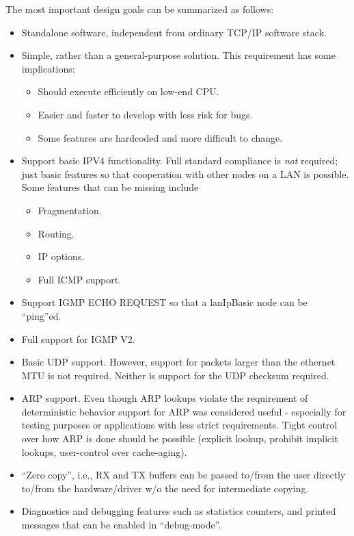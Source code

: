 \documentclass{article}
\newcommand{\lip}{lanIpBasic}
\newcommand{\ethn}{ethernet}
\begin{document}
The most important design goals can be summarized as
follows:
\begin{itemize}
\item Standalone software, independent from ordinary TCP/IP software stack.
\item Simple, rather than a general-purpose solution. This requirement
      has some implications:
      \begin{itemize}
      \item Should execute efficiently on low-end CPU.
      \item Easier and faster to develop with less risk for bugs.
      \item Some features are hardcoded and more difficult to change.
      \end{itemize}
\item Support basic IPV4 functionality. Full standard compliance is
      {\em not} required; just basic features so that cooperation
      with other nodes on a LAN is possible. Some features that
      can be missing include
      \begin{itemize}
      \item Fragmentation.
      \item Routing.
      \item IP options.
      \item Full ICMP support.
      \end{itemize}
\item Support IGMP ECHO REQUEST so that a \lip{} node can be ``ping''ed.
\item Full support for IGMP V2.
\item Basic UDP support. However, support for packets larger than the
      \ethn{} MTU is not required. Neither is support for the UDP checksum
      required.
\item ARP support. Even though ARP lookups violate the requirement of
      deterministic behavior support for ARP was considered useful - especially
      for testing purposes or applications with less strict requirements.
      Tight control over how ARP is done should be possible (explicit lookup,
      prohibit implicit lookups, user-control over cache-aging).
\item ``Zero copy'', i.e., RX and TX buffers can be passed to/from the
      user directly to/from the hardware/driver w/o the need for intermediate
      copying.
\item Diagnostics and debugging features such as statistics counters, and
      printed messages that can be enabled in ``debug-mode''.
\end{itemize}
\end{document}
